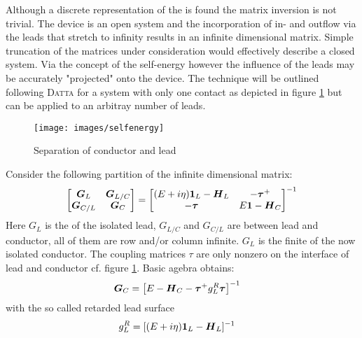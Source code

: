Although a discrete representation of the \hamil{} is found the matrix inversion is not trivial. The device is an open system and the incorporation of in- and outflow via the leads that stretch to infinity results in an infinite dimensional matrix.
Simple truncation of the matrices under consideration would effectively describe a closed system. Via the concept of the self-energy however the influence of the leads may be accurately "projected" onto the device.
The technique will be outlined following \textsc{Datta} for a system with only one contact as depicted in figure \ref{fig:selfenergy} but can be applied to an arbitray number of leads.
\begin{figure}[h!]
\centering
\texttt{[image: images/selfenergy]}
\caption{Separation of conductor and lead}
\label{fig:selfenergy}
\end{figure}

Consider the following partition of the infinite dimensional \gfnc{} matrix:
\begin{align}
  \begin{bmatrix}
  \boldsymbol{G}_{L} & \boldsymbol{G}_{L/C}\\
  \boldsymbol{G}_{C/L} & \boldsymbol{G}_{C}
  \end{bmatrix}
  =
  \begin{bmatrix}
  (E+i\eta)\boldsymbol{1}_{L} - \boldsymbol{H}_L  & -\boldsymbol{\tau}^+ \\
	-\boldsymbol{\tau} & E\boldsymbol{1} - \boldsymbol{H}_C
  \end{bmatrix}^{-1}
  \label{eqn:greendivided}
\end{align}
Here $G_L$ is the \gfnc{} of the isolated lead, $G_{L/C}$ and $G_{C/L}$ are \gfnc{} between lead and conductor, all of them are row and/or column infinite. $G_L$ is the finite \gfnc{} of the now isolated conductor. The coupling matrices $\tau$ are only nonzero on the interface of lead and conductor cf. figure \ref{fig:selfenergy}.
Basic agebra obtains\cite{Datta1997}:
\begin{align}
\boldsymbol{G}_C& = \left[E-\boldsymbol{H}_C - \boldsymbol{\tau}^+ g_L^R \boldsymbol{\tau}\right]^{-1} 
\end{align}
with the so called retarded lead surface \gfnc{}
\begin{align}
g_L^R &= [(E+i\eta)\boldsymbol{1}_L - \boldsymbol{H}_L]^{-1}
\label{eqn:leadsurfacegfnc}
\end{align}

